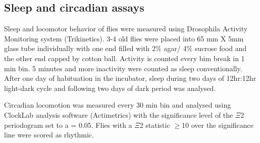 \subsection*{Sleep and circadian assays}

Sleep and locomotor behavior of flies were measured using Drosophila Activity Monitoring system (Trikinetics).
3-4 old flies were placed into 65 mm X 5mm glass tube individually with one end filled with 2\% agar/ 4\% sucrose food and the other end capped by cotton ball.
Activity is counted every bim break in 1 min bin.
5 minutes and more inactivity were counted as sleep conventionally.
After one day of habituation in the incubator, sleep during two days of 12hr:12hr light-dark cycle and following two days of dark period was analysed.

Circadian locomotion was measured every 30 min bin and analysed using ClockLab analysis software (Actimetrics) with the significance level of the $\Xi$2 periodogram set to a = 0.05.
Flies with a $\Xi$2 statistic $\geq$10 over the significance line were scored as rhythmic.
    